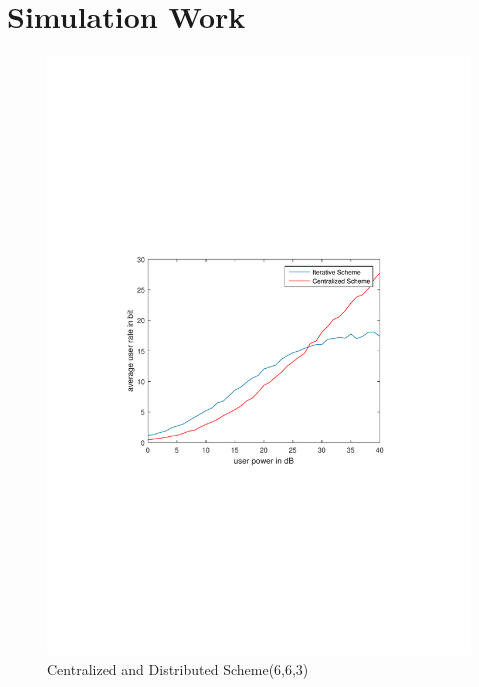 \documentclass[12pt, onecolumn]{IEEEtran}
\begin{document}

\section{Simulation Work}

\begin{figure}[H]
    \centering\includegraphics[width=0.6\columnwidth]{result_66.pdf}
    \caption{ Centralized and Distributed Scheme(6,6,3)}\label{FIG:Compare}
\end{figure}
\end{document}
